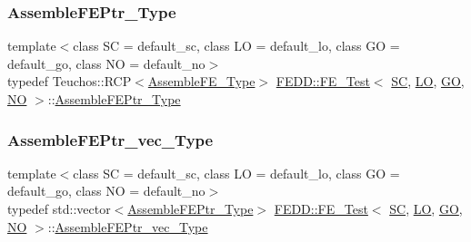 \mbox{\label{classFEDD_1_1FE__Test_a7a938cd88b5f936c58993fff97074e2d}} 
\subsubsection{\texorpdfstring{Assemble\+F\+E\+Ptr\+\_\+\+Type}{AssembleFEPtr\_Type}}
{\footnotesize\ttfamily template$<$class SC  = default\+\_\+sc, class LO  = default\+\_\+lo, class GO  = default\+\_\+go, class NO  = default\+\_\+no$>$ \\
typedef Teuchos\+::\+R\+CP$<$\hyperlink{classFEDD_1_1FE__Test_afbc20c921480ce9f89ec045f94f6806a}{Assemble\+F\+E\+\_\+\+Type}$>$ \hyperlink{classFEDD_1_1FE__Test}{F\+E\+D\+D\+::\+F\+E\+\_\+\+Test}$<$ \hyperlink{fe__test__laplace_8cpp_a79c7e86a57edbb2a5a53242bcd04e41e}{SC}, \hyperlink{fe__test__laplace_8cpp_ad6a38c9f07d3fd633eefca5bccad8410}{LO}, \hyperlink{fe__test__laplace_8cpp_afa2946b509009b4f45eb04bd8c5b27d9}{GO}, \hyperlink{fe__test__laplace_8cpp_a5e24f37b28787429872b6ecb1d0417ce}{NO} $>$\+::\hyperlink{classFEDD_1_1FE__Test_a7a938cd88b5f936c58993fff97074e2d}{Assemble\+F\+E\+Ptr\+\_\+\+Type}}

\mbox{\label{classFEDD_1_1FE__Test_a7c6207bb2e578ea92dbfb20aa766e2d3}} 
\subsubsection{\texorpdfstring{Assemble\+F\+E\+Ptr\+\_\+vec\+\_\+\+Type}{AssembleFEPtr\_vec\_Type}}
{\footnotesize\ttfamily template$<$class SC  = default\+\_\+sc, class LO  = default\+\_\+lo, class GO  = default\+\_\+go, class NO  = default\+\_\+no$>$ \\
typedef std\+::vector$<$\hyperlink{classFEDD_1_1FE__Test_a7a938cd88b5f936c58993fff97074e2d}{Assemble\+F\+E\+Ptr\+\_\+\+Type}$>$ \hyperlink{classFEDD_1_1FE__Test}{F\+E\+D\+D\+::\+F\+E\+\_\+\+Test}$<$ \hyperlink{fe__test__laplace_8cpp_a79c7e86a57edbb2a5a53242bcd04e41e}{SC}, \hyperlink{fe__test__laplace_8cpp_ad6a38c9f07d3fd633eefca5bccad8410}{LO}, \hyperlink{fe__test__laplace_8cpp_afa2946b509009b4f45eb04bd8c5b27d9}{GO}, \hyperlink{fe__test__laplace_8cpp_a5e24f37b28787429872b6ecb1d0417ce}{NO} $>$\+::\hyperlink{classFEDD_1_1FE__Test_a7c6207bb2e578ea92dbfb20aa766e2d3}{Assemble\+F\+E\+Ptr\+\_\+vec\+\_\+\+Type}}

